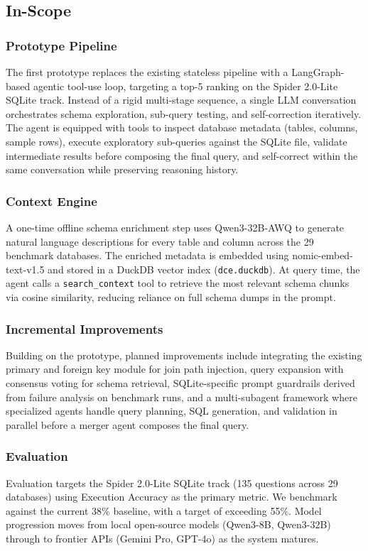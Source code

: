 \subsection{In-Scope}

\subsubsection{Prototype Pipeline}
The first prototype replaces the existing stateless pipeline with a LangGraph-based agentic tool-use loop, targeting a top-5 ranking on the Spider 2.0-Lite SQLite track. Instead of a rigid multi-stage sequence, a single LLM conversation orchestrates schema exploration, sub-query testing, and self-correction iteratively. The agent is equipped with tools to inspect database metadata (tables, columns, sample rows), execute exploratory sub-queries against the SQLite file, validate intermediate results before composing the final query, and self-correct within the same conversation while preserving reasoning history.

\subsubsection{Context Engine}
A one-time offline schema enrichment step uses Qwen3-32B-AWQ to generate natural language descriptions for every table and column across the 29 benchmark databases. The enriched metadata is embedded using nomic-embed-text-v1.5 and stored in a DuckDB vector index (\texttt{dce.duckdb}). At query time, the agent calls a \texttt{search\_context} tool to retrieve the most relevant schema chunks via cosine similarity, reducing reliance on full schema dumps in the prompt.

\subsubsection{Incremental Improvements}
Building on the prototype, planned improvements include integrating the existing primary and foreign key module for join path injection, query expansion with consensus voting for schema retrieval, SQLite-specific prompt guardrails derived from failure analysis on benchmark runs, and a multi-subagent framework where specialized agents handle query planning, SQL generation, and validation in parallel before a merger agent composes the final query.


\subsubsection{Evaluation}
Evaluation targets the Spider 2.0-Lite SQLite track (135 questions across 29 databases) using Execution Accuracy as the primary metric. We benchmark against the current 38\% baseline, with a target of exceeding 55\%. Model progression moves from local open-source models (Qwen3-8B, Qwen3-32B) through to frontier APIs (Gemini Pro, GPT-4o) as the system matures.

